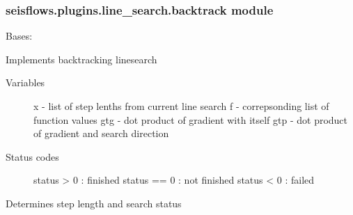 \documentclass[letterpaper,10pt,english]{sphinxmanual}
\begin{document}
\subsubsection{seisflows.plugins.line\_search.backtrack module}
\label{\detokenize{ref/seisflows.plugins.line_search:module-seisflows.plugins.line_search.backtrack}}\label{\detokenize{ref/seisflows.plugins.line_search:seisflows-plugins-line-search-backtrack-module}}

\begin{fulllineitems}
\label{\detokenize{ref/seisflows.plugins.line_search:seisflows.plugins.line_search.backtrack.Backtrack}}
Bases: {\hyperref[\detokenize{ref/seisflows.plugins.line_search:seisflows.plugins.line_search.bracket.Bracket}]{}}

Implements backtracking linesearch
\begin{description}
\item[{Variables}] \leavevmode
x - list of step lenths from current line search
f - correpsonding list of function values
gtg - dot product of gradient with itself
gtp - dot product of gradient and search direction

\item[{Status codes}] \leavevmode
status \textgreater{} 0  : finished
status == 0 : not finished
status \textless{} 0  : failed

\end{description}

\begin{fulllineitems}
\label{\detokenize{ref/seisflows.plugins.line_search:seisflows.plugins.line_search.backtrack.Backtrack.calculate_step}}
Determines step length and search status

\end{fulllineitems}


\end{fulllineitems}
\end{document}

